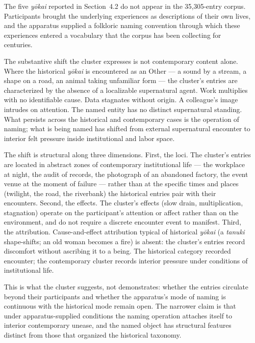 \documentclass[manuscript,review,anonymous,nonacm]{acmart}
\begin{document}
The five \textit{y\=okai} reported in Section~4.2 do not appear in the 35{,}305-entry corpus. Participants brought the underlying experiences as descriptions of their own lives, and the apparatus supplied a folkloric naming convention through which these experiences entered a vocabulary that the corpus has been collecting for centuries.

The substantive shift the cluster expresses is not contemporary content alone. Where the historical \textit{y\=okai} is encountered as an Other — a sound by a stream, a shape on a road, an animal taking unfamiliar form — the cluster's entries are characterized by the absence of a localizable supernatural agent. Work multiplies with no identifiable cause. Data stagnates without origin. A colleague's image intrudes on attention. The named entity has no distinct supernatural standing. What persists across the historical and contemporary cases is the operation of naming; what is being named has shifted from external supernatural encounter to interior felt pressure inside institutional and labor space.

The shift is structural along three dimensions. First, the loci. The cluster's entries are located in abstract zones of contemporary institutional life — the workplace at night, the audit of records, the photograph of an abandoned factory, the event venue at the moment of failure — rather than at the specific times and places (twilight, the road, the riverbank) the historical entries pair with their encounters. Second, the effects. The cluster's effects (slow drain, multiplication, stagnation) operate on the participant's attention or affect rather than on the environment, and do not require a discrete encounter event to manifest. Third, the attribution. Cause-and-effect attribution typical of historical \textit{y\=okai} (a \textit{tanuki} shape-shifts; an old woman becomes a fire) is absent: the cluster's entries record discomfort without ascribing it to a being. The historical category recorded encounter; the contemporary cluster records interior pressure under conditions of institutional life.

This is what the cluster suggests, not demonstrates: whether the entries circulate beyond their participants and whether the apparatus's mode of naming is continuous with the historical mode remain open. The narrower claim is that under apparatus-supplied conditions the naming operation attaches itself to interior contemporary unease, and the named object has structural features distinct from those that organized the historical taxonomy.
\end{document}
